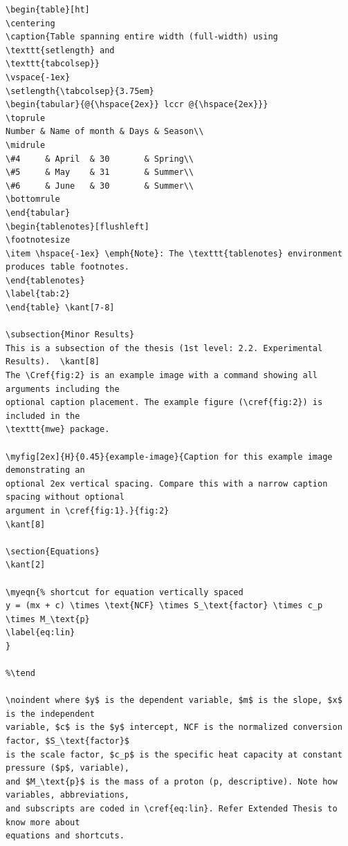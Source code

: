 \documentclass[letterpaper]{refart}
\newcommand\tend{\end{document}}
\begin{document}
{\begin{verbatim}
\begin{table}[ht]
\centering
\caption{Table spanning entire width (full-width) using \texttt{setlength} and
\texttt{tabcolsep}}
\vspace{-1ex}
\setlength{\tabcolsep}{3.75em}
\begin{tabular}{@{\hspace{2ex}} lccr @{\hspace{2ex}}}
\toprule
Number & Name of month & Days & Season\\
\midrule
\#4 	& April  & 30		& Spring\\
\#5 	& May    & 31		& Summer\\
\#6 	& June   & 30		& Summer\\
\bottomrule
\end{tabular}
\begin{tablenotes}[flushleft]
\footnotesize
\item \hspace{-1ex} \emph{Note}: The \texttt{tablenotes} environment produces table footnotes. 
\end{tablenotes}
\label{tab:2}
\end{table}	\kant[7-8]

\subsection{Minor Results}
This is a subsection of the thesis (1st level: 2.2. Experimental Results). 	\kant[8]
The \Cref{fig:2} is an example image with a command showing all arguments including the 
optional caption placement. The example figure (\cref{fig:2}) is included in the 
\texttt{mwe} package.

\myfig[2ex]{H}{0.45}{example-image}{Caption for this example image demonstrating an 
optional 2ex vertical spacing. Compare this with a narrow caption spacing without optional 
argument in \cref{fig:1}.}{fig:2}    
\kant[8]

\section{Equations}
\kant[2]

\myeqn{% shortcut for equation vertically spaced
y = (mx + c) \times \text{NCF} \times S_\text{factor} \times c_p \times M_\text{p}
\label{eq:lin}
}

%\tend

\noindent where $y$ is the dependent variable, $m$ is the slope, $x$ is the independent 
variable, $c$ is the $y$ intercept, NCF is the normalized conversion factor, $S_\text{factor}$ 
is the scale factor, $c_p$ is the specific heat capacity at constant pressure ($p$, variable), 
and $M_\text{p}$ is the mass of a proton (p, descriptive). Note how variables, abbreviations, 
and subscripts are coded in \cref{eq:lin}. Refer Extended Thesis to know more about 
equations and shortcuts. 


\end{verbatim}}
\end{document}
